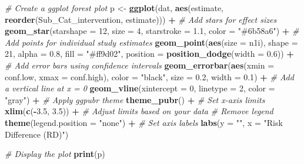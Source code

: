 \documentclass[
]{book}
\newenvironment{Shaded}{\begin{snugshade}}{\end{snugshade}}
\newcommand{\AttributeTok}[1]{\textcolor[rgb]{0.13,0.29,0.53}{#1}}
\newcommand{\CommentTok}[1]{\textcolor[rgb]{0.56,0.35,0.01}{\textit{#1}}}
\newcommand{\DecValTok}[1]{\textcolor[rgb]{0.00,0.00,0.81}{#1}}
\newcommand{\FloatTok}[1]{\textcolor[rgb]{0.00,0.00,0.81}{#1}}
\newcommand{\FunctionTok}[1]{\textcolor[rgb]{0.13,0.29,0.53}{\textbf{#1}}}
\newcommand{\NormalTok}[1]{#1}
\newcommand{\OtherTok}[1]{\textcolor[rgb]{0.56,0.35,0.01}{#1}}
\newcommand{\SpecialCharTok}[1]{\textcolor[rgb]{0.81,0.36,0.00}{\textbf{#1}}}
\newcommand{\StringTok}[1]{\textcolor[rgb]{0.31,0.60,0.02}{#1}}
\begin{document}
\begin{Shaded}
\begin{Highlighting}[]
\CommentTok{\# Create a ggplot forest plot}
\NormalTok{p }\OtherTok{\textless{}{-}} \FunctionTok{ggplot}\NormalTok{(dat, }\FunctionTok{aes}\NormalTok{(estimate, }\FunctionTok{reorder}\NormalTok{(Sub\_Cat\_intervention, estimate))) }\SpecialCharTok{+}
  \CommentTok{\# Add stars for effect sizes}
  \FunctionTok{geom\_star}\NormalTok{(}\AttributeTok{starshape =} \DecValTok{12}\NormalTok{, }\AttributeTok{size =} \DecValTok{4}\NormalTok{, }\AttributeTok{starstroke =} \FloatTok{1.1}\NormalTok{, }\AttributeTok{color =} \StringTok{"\#6b58a6"}\NormalTok{) }\SpecialCharTok{+}
  \CommentTok{\# Add points for individual study estimates}
  \FunctionTok{geom\_point}\NormalTok{(}\FunctionTok{aes}\NormalTok{(}\AttributeTok{size =}\NormalTok{ n1i), }\AttributeTok{shape =} \DecValTok{21}\NormalTok{, }\AttributeTok{alpha =} \FloatTok{0.8}\NormalTok{, }\AttributeTok{fill =} \StringTok{"\#ff9d02"}\NormalTok{,}
             \AttributeTok{position =} \FunctionTok{position\_dodge}\NormalTok{(}\AttributeTok{width =} \FloatTok{0.6}\NormalTok{)) }\SpecialCharTok{+}
  \CommentTok{\# Add error bars using confidence intervals}
  \FunctionTok{geom\_errorbar}\NormalTok{(}\FunctionTok{aes}\NormalTok{(}\AttributeTok{xmin =}\NormalTok{ conf.low, }\AttributeTok{xmax =}\NormalTok{ conf.high), }\AttributeTok{color =} \StringTok{"black"}\NormalTok{,}
                \AttributeTok{size =} \FloatTok{0.2}\NormalTok{, }\AttributeTok{width =} \FloatTok{0.1}\NormalTok{) }\SpecialCharTok{+}
  \CommentTok{\# Add a vertical line at x = 0}
  \FunctionTok{geom\_vline}\NormalTok{(}\AttributeTok{xintercept =} \DecValTok{0}\NormalTok{, }\AttributeTok{linetype =} \DecValTok{2}\NormalTok{, }\AttributeTok{color =} \StringTok{"gray"}\NormalTok{) }\SpecialCharTok{+}
  \CommentTok{\# Apply ggpubr theme}
  \FunctionTok{theme\_pubr}\NormalTok{() }\SpecialCharTok{+}
  \CommentTok{\# Set x{-}axis limits}
  \FunctionTok{xlim}\NormalTok{(}\FunctionTok{c}\NormalTok{(}\SpecialCharTok{{-}}\FloatTok{3.5}\NormalTok{, }\FloatTok{3.5}\NormalTok{)) }\SpecialCharTok{+}  \CommentTok{\# Adjust limits based on your data}
  \CommentTok{\# Remove legend}
  \FunctionTok{theme}\NormalTok{(}\AttributeTok{legend.position =} \StringTok{"none"}\NormalTok{) }\SpecialCharTok{+}
  \CommentTok{\# Set axis labels}
  \FunctionTok{labs}\NormalTok{(}\AttributeTok{y =} \StringTok{""}\NormalTok{, }\AttributeTok{x =} \StringTok{"Risk Difference (RD)"}\NormalTok{)}

\CommentTok{\# Display the plot}
\FunctionTok{print}\NormalTok{(p)}
\end{Highlighting}
\end{Shaded}
\end{document}
